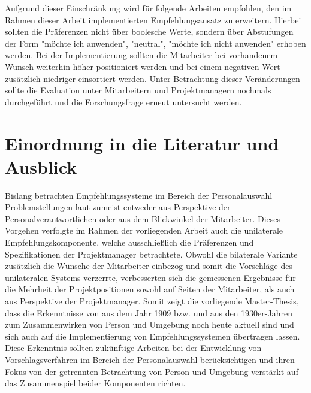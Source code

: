 Aufgrund dieser Einschränkung wird für folgende Arbeiten empfohlen, den im Rahmen dieser Arbeit implementierten Empfehlungsansatz zu erweitern. Hierbei sollten die Präferenzen nicht über boolesche Werte, sondern über Abstufungen der Form "möchte ich anwenden", "neutral", "möchte ich nicht anwenden" erhoben werden. Bei der Implementierung sollten die Mitarbeiter bei vorhandenem Wunsch weiterhin höher positioniert werden und bei einem negativen Wert zusätzlich niedriger einsortiert werden. Unter Betrachtung dieser Veränderungen sollte die Evaluation unter Mitarbeitern und Projektmanagern nochmals durchgeführt und die Forschungsfrage erneut untersucht werden.

\section{Einordnung in die Literatur und Ausblick}
\label{ch:diskussion:einordnung}
Bislang betrachten Empfehlungssysteme im Bereich der Personalauswahl Problemstellungen laut \textcite[S. 1ff.]{malinowski:2006} zumeist entweder aus Perspektive der Personalverantwortlichen oder aus dem Blickwinkel der Mitarbeiter. Dieses Vorgehen verfolgte im Rahmen der vorliegenden Arbeit auch die unilaterale Empfehlungskomponente, welche ausschließlich die Präferenzen und Spezifikationen der Projektmanager betrachtete. Obwohl die bilaterale Variante zusätzlich die Wünsche der Mitarbeiter einbezog und somit die Vorschläge des unilateralen Systems verzerrte, verbesserten sich die gemessenen Ergebnisse für die Mehrheit der Projektpositionen sowohl auf Seiten der Mitarbeiter, als auch aus Perspektive der Projektmanager. Somit zeigt die vorliegende Master-Thesis, dass die Erkenntnisse von \textcite[S. 5ff.]{parsons:1909} aus dem Jahr 1909 bzw. \textcite[S. 11f.]{lewin:1936} und \textcite[S. 38ff.]{murray:1938} aus den 1930er-Jahren zum Zusammenwirken von Person und Umgebung noch heute aktuell sind und sich auch auf die Implementierung von Empfehlungssystemen übertragen lassen. Diese Erkenntnis sollten zukünftige Arbeiten bei der Entwicklung von Vorschlagsverfahren im Bereich der Personalauswahl berücksichtigen und ihren Fokus von der getrennten Betrachtung von Person und Umgebung verstärkt auf das Zusammenspiel beider Komponenten richten. 
